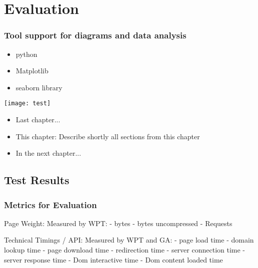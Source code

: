 \chapter{Evaluation}



\subsection{Tool support for diagrams and data analysis}

\begin{itemize}
\item python
\item Matplotlib
\item seaborn library
\end{itemize}


\texttt{[image: test]}


\begin{itemize}
	\item Last chapter...
	\item This chapter: Describe shortly all sections from this chapter
	\item In the next chapter...
\end{itemize}









\section{Test Results}

\subsection{Metrics for Evaluation}

Page Weight: Measured by WPT:
- bytes
- bytes uncompressed
- Requests


Technical Timings / API: Measured by WPT and GA:
- page load time
- domain lookup time
- page download time
- redirection time
- server connection time
- server response time
- Dom interactive time
- Dom content loaded time

